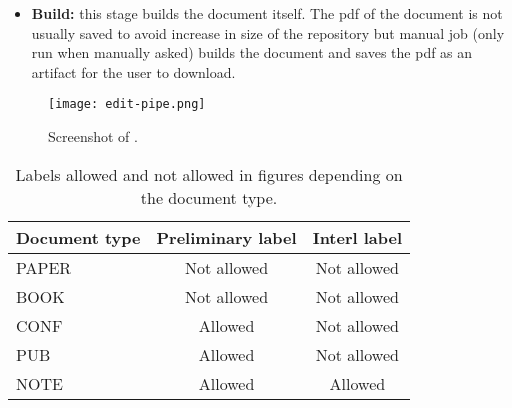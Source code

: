 \begin{itemize}
\begin{itemize}
    \item \textit{Title and Abstract:} checks that no user-defined commands (i.e. not \LaTeX\ commands) are being used nor in the title neither in the abstract.
  \end{itemize}
  \item \textbf{Build:} this stage builds the document itself. The pdf of the document is not usually saved to avoid increase in size of the repository but manual job (only run when manually asked) builds the document and saves the pdf as an artifact for the user to download.
\end{itemize}

\begin{figure}[ht!]
  \centering
  \texttt{[image: edit-pipe.png]}
  \caption{Screenshot of \epipe.}
  \label{fig:edit-pipe}
\end{figure}

\begin{table}
  \centering
  \begin{tabular}{l|c|c}
    \toprule
    \textbf{Document type} & \textbf{Preliminary label} & \textbf{Interl label} \\
    \midrule
    PAPER	& Not allowed	& Not allowed \\\midrule
    BOOK &	Not allowed	& Not allowed \\\midrule
    CONF &	Allowed	& Not allowed \\\midrule
    PUB &	Allowed	& Not allowed \\\midrule
    NOTE &	Allowed	& Allowed \\\bottomrule
  \end{tabular}
  \caption{Labels allowed and not allowed in figures depending on the document type.}
  \label{tab:labels-files}
\end{table}